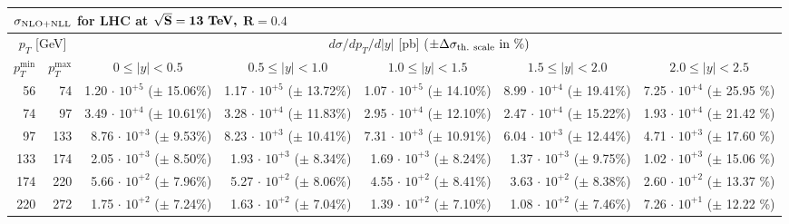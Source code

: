 
\begin{table}[h!]
\renewcommand{\arraystretch}{1.3}
\begin{center}
\begin{tabular}{|r|r|r|r|r|r|r|}
  \hline
  \multicolumn{7}{l}{$\mathbf{\sigma_{\rm NLO + NLL}}$ \bf{for LHC at} $\mathbf{\sqrt{S}=13~\mbox{\bf TeV,}}$ $\mathbf{R=0.4}$}\\ 
  \hline
  \hline
\multicolumn{2}{|c|}{$p_T$ [GeV]} &
\multicolumn{5}{|c|}{$d\sigma/dp_T/d|y|$ [pb] \quad ($\pm \Delta \sigma_{\rm th.~scale}~\mbox{in}~\%) $} \\
\multicolumn{1}{|c|}{$p_T^{\min}$} &
\multicolumn{1}{|c|}{$p_T^{\max}$} &
\multicolumn{1}{|c|}{$0 \le |y| < 0.5$} &
\multicolumn{1}{|c|}{$0.5 \le |y| < 1.0$} &
\multicolumn{1}{|c|}{$1.0 \le |y| < 1.5$} &
\multicolumn{1}{|c|}{$1.5 \le |y| < 2.0$} &
\multicolumn{1}{|c|}{$2.0 \le |y| < 2.5$} \\
\hline
%
  56 &   74 & 1.20$\,\cdot\, 10^{+5}$  ($\pm\!\!$ 15.06\%) & 1.17$\,\cdot\, 10^{+5}$  ($\pm\!\!$ 13.72\%) & 1.07$\,\cdot\, 10^{+5}$  ($\pm\!\!$ 14.10\%) & 8.99$\,\cdot\, 10^{+4}$  ($\pm\!\!$ 19.41\%) & 7.25$\,\cdot\, 10^{+4}$  ($\pm\!\!$ 25.95 \%)\\
  74 &   97 & 3.49$\,\cdot\, 10^{+4}$  ($\pm\!\!$ 10.61\%) & 3.28$\,\cdot\, 10^{+4}$  ($\pm\!\!$ 11.83\%) & 2.95$\,\cdot\, 10^{+4}$  ($\pm\!\!$ 12.10\%) & 2.47$\,\cdot\, 10^{+4}$  ($\pm\!\!$ 15.22\%) & 1.93$\,\cdot\, 10^{+4}$  ($\pm\!\!$ 21.42 \%)\\
  97 &  133 & 8.76$\,\cdot\, 10^{+3}$  ($\pm\!\!$  9.53\%) & 8.23$\,\cdot\, 10^{+3}$  ($\pm\!\!$ 10.41\%) & 7.31$\,\cdot\, 10^{+3}$  ($\pm\!\!$ 10.91\%) & 6.04$\,\cdot\, 10^{+3}$  ($\pm\!\!$ 12.44\%) & 4.71$\,\cdot\, 10^{+3}$  ($\pm\!\!$ 17.60 \%)\\
 133 &  174 & 2.05$\,\cdot\, 10^{+3}$  ($\pm\!\!$  8.50\%) & 1.93$\,\cdot\, 10^{+3}$  ($\pm\!\!$  8.34\%) & 1.69$\,\cdot\, 10^{+3}$  ($\pm\!\!$  8.24\%) & 1.37$\,\cdot\, 10^{+3}$  ($\pm\!\!$  9.75\%) & 1.02$\,\cdot\, 10^{+3}$  ($\pm\!\!$ 15.06 \%)\\
 174 &  220 & 5.66$\,\cdot\, 10^{+2}$  ($\pm\!\!$  7.96\%) & 5.27$\,\cdot\, 10^{+2}$  ($\pm\!\!$  8.06\%) & 4.55$\,\cdot\, 10^{+2}$  ($\pm\!\!$  8.41\%) & 3.63$\,\cdot\, 10^{+2}$  ($\pm\!\!$  8.38\%) & 2.60$\,\cdot\, 10^{+2}$  ($\pm\!\!$ 13.37 \%)\\
 220 &  272 & 1.75$\,\cdot\, 10^{+2}$  ($\pm\!\!$  7.24\%) & 1.63$\,\cdot\, 10^{+2}$  ($\pm\!\!$  7.04\%) & 1.39$\,\cdot\, 10^{+2}$  ($\pm\!\!$  7.10\%) & 1.08$\,\cdot\, 10^{+2}$  ($\pm\!\!$  7.46\%) & 7.26$\,\cdot\, 10^{+1}$  ($\pm\!\!$ 12.22 \%)\\

\end{tabular}
\end{center}
\end{table}
